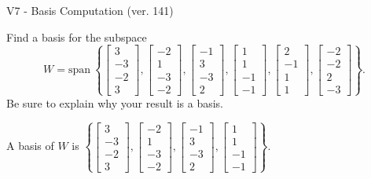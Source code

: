 \begin{exercise}
  \begin{exerciseTitle}V7 - Basis Computation (ver. 141)\end{exerciseTitle}
  \begin{exerciseStatement}
    Find a basis for the subspace 
\[W=\mathrm{span}\ \left\{\left[\begin{array}{r}
3 \\
-3 \\
-2 \\
3
\end{array}\right] , \left[\begin{array}{r}
-2 \\
1 \\
-3 \\
-2
\end{array}\right] , \left[\begin{array}{r}
-1 \\
3 \\
-3 \\
2
\end{array}\right] , \left[\begin{array}{r}
1 \\
1 \\
-1 \\
-1
\end{array}\right] , \left[\begin{array}{r}
2 \\
-1 \\
1 \\
1
\end{array}\right] , \left[\begin{array}{r}
-2 \\
-2 \\
2 \\
-3
\end{array}\right]\right\}.\]
 Be sure to explain why your result is a basis.


  \end{exerciseStatement}
  \begin{exerciseAnswer}
   A basis of \(W\) is  \(\left\{\left[\begin{array}{r}
3 \\
-3 \\
-2 \\
3
\end{array}\right] , \left[\begin{array}{r}
-2 \\
1 \\
-3 \\
-2
\end{array}\right] , \left[\begin{array}{r}
-1 \\
3 \\
-3 \\
2
\end{array}\right] , \left[\begin{array}{r}
1 \\
1 \\
-1 \\
-1
\end{array}\right]\right\}\).
  


  \end{exerciseAnswer}
\end{exercise}